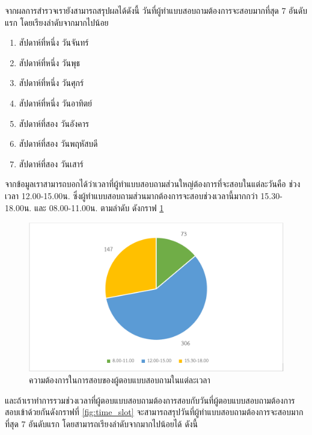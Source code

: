 จากผลการสำรวจเรายังสามารถสรุปผลได้ดังนี้
วันที่ผู้ทำแบบสอบถามต้องการจะสอบมากที่สุด 7 อันดับแรก โดยเรียงลำดับจากมากไปน้อย
\begin{enumerate}
  \item สัปดาห์ที่หนึ่ง วันจันทร์
  \item สัปดาห์ที่หนึ่ง วันพุธ
  \item สัปดาห์ที่หนึ่ง วันศุกร์ 
  \item สัปดาห์ที่หนึ่ง วันอาทิตย์
  \item สัปดาห์ที่สอง วันอังคาร
  \item สัปดาห์ที่สอง วันพฤหัสบดี
  \item สัปดาห์ที่สอง วันเสาร์
\end{enumerate}

จากข้อมูลเราสามารถบอกได้ว่าเวลาที่ผู้ทำแบบสอบถามส่วนใหญ่ต้องการที่จะสอบในแต่ละวันคือ
ช่วงเวลา 12.00-15.00น. ซึ่งผู้ทำแบบสอบถามส่วนมากต้องการจะสอบช่วงเวลานี้มากกว่า 15.30-18.00น. และ 08.00-11.00น. ตามลำดับ ดังกราฟ \ref{fig:time}
\begin{figure}
  \begin{center}
    \includegraphics[width=\linewidth]{images/pie_chart_for_final_exam_time.png}
  \end{center}
  \caption[วามต้องการในการสอบของผู้ตอบแบบสอบถามในแต่ละเวลา]{ความต้องการในการสอบของผู้ตอบแบบสอบถามในแต่ละเวลา}
  \label{fig:time}
\end{figure}
และถ้าเราทำการรวมช่วงเวลาที่ผู้ตอบแบบสอบถามต้องการสอบกับวันที่ผู้ตอบแบบสอบถามต้องการสอบเข้าด้วยกันดังกราฟที่ \ref{fig:time_slot} จะสามารถสรุปวันที่ผู้ทำแบบสอบถามต้องการจะสอบมากที่สุด 7 อันดับแรก โดยสามารถเรียงลำดับจากมากไปน้อยได้ ดังนี้

